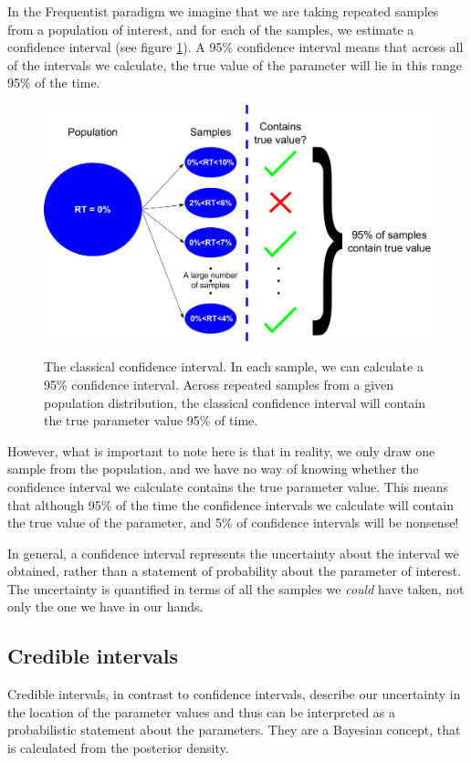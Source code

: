 \documentclass[11pt,fullpage]{book}
\begin{document}
In the Frequentist paradigm we imagine that we are taking repeated samples from a population of interest, and for each of the samples, we estimate a confidence interval (see figure \ref{fig:Posterior_classicalConfidenceInterval}). A 95\% confidence interval means that across all of the intervals we calculate, the true value of the parameter will lie in this range 95\% of the time. 

\begin{figure}
\centering
\scalebox{0.4} 
{\includegraphics{Posterior_classicalConfidenceInterval.pdf}}
\caption{The classical confidence interval. In each sample, we can calculate a 95\% confidence interval. Across repeated samples from a given population distribution, the classical confidence interval will contain the true parameter value 95\% of time.}\label{fig:Posterior_classicalConfidenceInterval}
\end{figure}

However, what is important to note here is that in reality, we only draw one sample from the population, and we have no way of knowing whether the confidence interval we calculate contains the true parameter value. This means that although 95\% of the time the confidence intervals we calculate will contain the true value of the parameter, and 5\% of confidence intervals will be nonsense!

In general, a confidence interval represents the uncertainty about the interval we obtained, rather than a statement of probability about the parameter of interest. The uncertainty is quantified in terms of all the samples we \textit{could} have taken, not only the one we have in our hands.

\subsection{Credible intervals}
Credible intervals, in contrast to confidence intervals, describe our uncertainty in the location of the parameter values and thus can be interpreted as a probabilistic statement about the parameters. They are a Bayesian concept, that is calculated from the posterior density.
\end{document}
